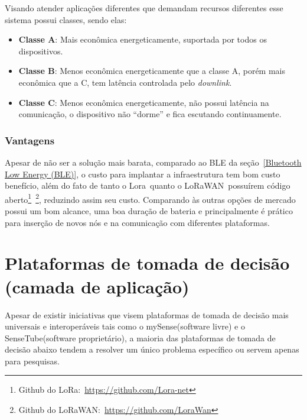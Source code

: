 \documentclass[
article,			%
12pt,				%
oneside,			%
a4paper,			%
english,			%
brazil,				%
sumario=tradicional
]{abntex2}
\begin{document}
Visando atender aplicações diferentes que demandam recursos diferentes esse sistema possui classes\cite{siteLorawan}, sendo elas:
\begin{itemize}
	\item \textbf{Classe A}: Mais econômica energeticamente, suportada por todos os dispositivos.
	\item \textbf{Classe B}: Menos econômica energeticamente que a classe A, porém mais econômica que a C, tem latência controlada pelo \textit{downlink}.
	\item \textbf{Classe C}: Menos econômica energeticamente, não possui latência na comunicação, o dispositivo não ``dorme'' e fica escutando continuamente.
\end{itemize}

\subsubsection{Vantagens}\label{Vantagens}
Apesar de não ser a solução mais barata, comparado ao BLE da seção~\ref{Bluetooth Low Energy (BLE)}, o custo para implantar a infraestrutura tem bom custo benefício\cite{siteLorawan}, além do fato de tanto o Lora\textregistered~quanto o LoRaWAN\texttrademark~possuírem código aberto\footnote{Github do LoRa:~\url{https://github.com/Lora-net}}~\footnote{Github do LoRaWAN:~\url{https://github.com/LoraWan}}, reduzindo assim seu custo. Comparando às outras opções de mercado possui um bom alcance, uma boa duração de bateria e principalmente é prático para inserção de novos nós e na comunicação com diferentes plataformas\cite{lorawan}.



\section{Plataformas de tomada de decisão (camada de aplicação)}\label{Plataformas de tomada de decisão}

Apesar de existir iniciativas que visem plataformas de tomada de decisão mais universais e interoperáveis tais como o mySense\cite{7}(software livre) e o SenseTube\cite{6}(software proprietário), a maioria das plataformas de tomada de decisão abaixo tendem a resolver um único problema específico ou servem apenas para pesquisas.


\end{document}
